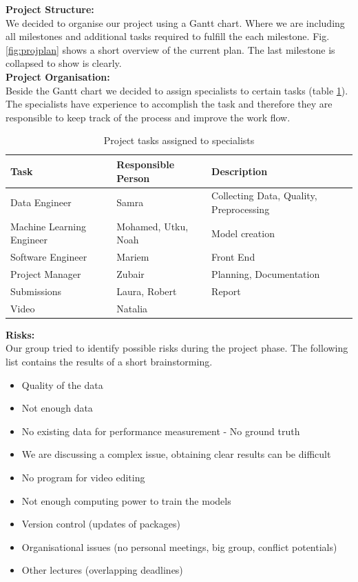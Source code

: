 \documentclass[a4paper,DIV=calc,11pt]{scrartcl}
\begin{document}
\textbf{Project Structure:}\\
We decided to organise our project using a Gantt chart. Where we are including all milestones and additional tasks required to fulfill the each milestone. Fig. \ref{fig:projplan} shows a short overview of the current plan. The last milestone is collapsed to show is clearly.\\

\textbf{Project Organisation:}\\
Beside the Gantt chart we decided to assign specialists to certain tasks (table \ref{tab:special}). The specialists have experience to accomplish the task and therefore they are responsible to keep track of the process and improve the work flow.\\


\begin{table}[ht]
\begin{tabular}{l|l|l}
Task                      & Responsible Person  & Description                             \\ \hline
Data Engineer             & Samra               & Collecting Data, Quality, Preprocessing \\
Machine Learning Engineer & Mohamed, Utku, Noah & Model creation                          \\
Software Engineer         & Mariem              & Front End                               \\
Project Manager           & Zubair              & Planning, Documentation                 \\
Submissions               & Laura, Robert       & Report                                  \\
Video                     & Natalia             &                                        
\end{tabular}
\caption{Project tasks assigned to specialists}
\label{tab:special}
\end{table}

\textbf{Risks:}\\
Our group tried to identify possible risks during the project phase. The following list contains the results of a short brainstorming.

\begin{itemize}
    \item Quality of the data
    \item Not enough data
    \item No existing data for performance measurement - No ground truth
    \item We are discussing a complex issue, obtaining clear results can be difficult
    \item No program for video editing
    \item Not enough computing power to train the models
    \item Version control (updates of packages)
    \item Organisational issues (no personal meetings, big group, conflict potentials)
    \item Other lectures (overlapping deadlines)
\end{itemize}
\end{document}
